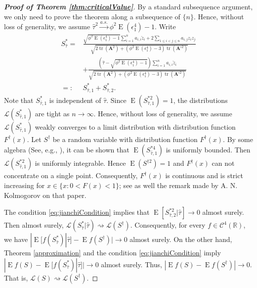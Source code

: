 \documentclass[bj]{imsart}
\DeclareMathOperator{\mytr}{tr}
\DeclareMathOperator{\myE}{E}
\newcommand{\BA}{\mathbf{A}}    \newcommand{\BB}{\mathbf{B}}    \newcommand{\BC}{\mathbf{C}}    \newcommand{\BD}{\mathbf{D}}    \newcommand{\BE}{\mathbf{E}}    \newcommand{\BF}{\mathbf{F}}    \newcommand{\BG}{\mathbf{G}}    \newcommand{\BH}{\mathbf{H}}    \newcommand{\BI}{\mathbf{I}}    \newcommand{\BJ}{\mathbf{J}}    \newcommand{\BK}{\mathbf{K}}    \newcommand{\BL}{\mathbf{L}}
\theoremstyle{plain}
\theoremstyle{definition}
\theoremstyle{remark}
\begin{document}
\begin{proof}[\textbf{Proof of Theorem \ref{thm:criticalValue}}]
    By a standard subsequence argument, we only need to prove the theorem along a subsequence of $\{n\}$.
    Hence, without loss of generality, we assume $\hat \tau^2 \xrightarrow{a.s.} \phi^2 \myE (\epsilon_1^4)-1$.
    Write
    \begin{equation*}
        \begin{split}
        S_{\hat \tau}^*
        =&
        \frac{
            \sqrt{\phi^2\myE (\epsilon_1^4)-1} \sum_{i=1}^n  a_{i,i}\check z_i
        +2\sum_{1\leq i <j \leq n} a_{i,j} z_i z_j
    }
    {
            \sqrt{
    2 \mytr(\BA^2)
    +
    (\phi^2\myE (\epsilon_1^4)-3) \mytr(\BA^{\circ 2})
            }             
        }
        \\
        &+
        \frac{
                (\hat \tau -
            \sqrt{
                \phi^2\myE (\epsilon_1^4)-1
            }
        )
             \sum_{i=1}^n  a_{i,i}\check z_i
    }
    {
            \sqrt{
    2 \mytr(\BA^2)
    +
    (\phi^2\myE (\epsilon_1^4)-3) \mytr(\BA^{\circ 2})
            }             
        }
        \\
        =:& S_{\hat \tau,1}^{*} + S_{\hat \tau,2}^{*}
    .
        \end{split}
    \end{equation*}
    Note that $S_{\hat{\tau},1}^*$ is independent of $\hat \tau$.
    Since $\myE ( S_{\hat \tau,1}^{*2} )=1$,  the distributions $\mathcal L(S_{\hat \tau,1}^{*}) $ are tight as $n\to \infty$.
    Hence, without loss of generality, we assume $\mathcal L (S_{\hat \tau,1}^*)$ weakly converges to a limit distribution with distribution function $F^\dagger(x)$.
    Let $S^\dagger$ be a random variable with distribution function $F^\dagger(x)$.
    By some algebra (See, e.g., \cite[Proposition A.1.(iii)]{chen2010tests} ),
    it can be shown that $\myE (S^{*4}_{\hat \tau,1})$ is uniformly bounded.
    Then $\mathcal L ( S_{\hat \tau,1}^{*2} )$ is  uniformly integrable.
    Hence $\myE(S^{\dagger 2})=1$ and $F^\dagger(x)$ can not concentrate on a single point.
    Consequently, $F^\dagger(x)$ is continuous and is strict increasing for $x\in\{x:0<F(x)<1\}$; see \cite{Sevast1961A} as well the remark made by A. N. Kolmogorov on that paper.

    The condition \eqref{eq:jianchiCondition} implies that $\myE[S_{\hat \tau,2}^{*2}|\hat \tau]\to 0$ almost surely.
    Then almost surely, $\mathcal L (S^*_{\hat \tau}|\hat \tau) \rightsquigarrow \mathcal L(S^\dagger)$.
    Consequently, for every $f\in \mathscr C^4 (\mathbb R)$,
    we have $| \myE [f(S^*_{\hat \tau}) |\hat\tau] - \myE f(S^\dagger) |\to 0$ almost surely.
    On the other hand, Theorem \ref{approximation} and the condition \eqref{eq:jianchiCondition} imply
        $|\myE f(S)- \myE [f(S^*_{\hat \tau})|\hat\tau] |\to 0$ almost surely.
        Thus, $|\myE f(S)- \myE f(S^\dagger) |\to 0$.
        That is, $\mathcal L (S)\rightsquigarrow \mathcal L (S^\dagger)$.


\end{proof}
\end{document}
